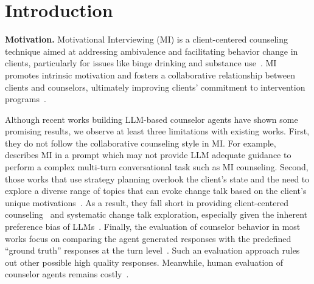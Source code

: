 \section{Introduction}

{\bf Motivation.} Motivational Interviewing (MI) is a client-centered counseling technique aimed at addressing ambivalence and facilitating behavior change in clients, particularly for issues like binge drinking and substance use~\citep{miller2002motivational}. 
MI promotes intrinsic motivation and fosters a collaborative relationship between clients and counselors, ultimately improving clients' commitment to intervention programs~\citep{martins2009review}. 

Although recent works building LLM-based counselor agents have shown some promising results, we observe at least three limitations with existing works. First, they do not follow the collaborative counseling style in MI. For example, \citet{steenstra2024virtual} describes MI in a prompt which may not provide LLM adequate guidance to perform a complex multi-turn conversational task such as MI counseling. Second, those works that use strategy planning overlook the client's state and the need to explore a diverse range of topics that can evoke change talk based on the client’s unique motivations~\citep{hsu2023helping,sun2024chain,xie2024few}. As a result, they fall short in providing client-centered counseling~\citep{steenstra2024virtual} and systematic change talk exploration, especially given the inherent preference bias of LLMs~\citep{kang2024can}. Finally, the evaluation of counselor behavior in most works focus on comparing the agent generated responses with the predefined ``ground truth'' responses at the turn level~\citep{sun2024chain}. Such an evaluation approach rules out other possible high quality responses.  Meanwhile, human evaluation of counselor agents remains costly~\citep{xie2024few,hsu2023helping,steenstra2024virtual}. 

